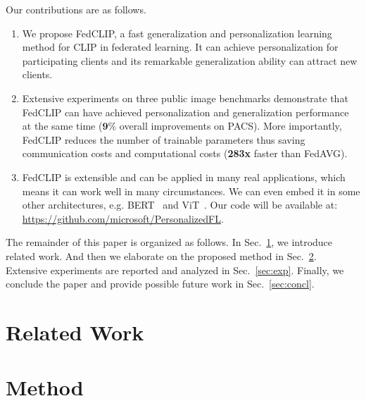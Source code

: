 \documentclass[11pt]{article}
\newcommand{\sectionname}{Sec.}
\newcommand{\method}{FedCLIP\xspace}
\newcommand{\wjdd}[1]{\todo[linecolor=cyan,backgroundcolor=cyan!25,bordercolor=cyan,size=\scriptsize]{(WJD): #1}}
\newcommand{\wjd}[1]{{\color{cyan}{[(WJD): #1]}}}
\begin{document}
Our contributions are as follows.
\begin{enumerate}
    \item We propose \method, a fast generalization and personalization learning method for CLIP in federated learning. It can achieve personalization for participating clients and its remarkable generalization ability can attract new clients.
    \item Extensive experiments on three public image benchmarks demonstrate that \method can have achieved personalization and generalization performance at the same time ($\textbf{9}\%$ overall improvements on PACS). More importantly, \method reduces the number of trainable parameters thus saving communication costs and computational costs (\textbf{283x} faster than FedAVG).%
    \item \method is extensible and can be applied in many real applications, which means it can work well in many circumstances. We can even embed it in some other architectures, e.g. BERT~\cite{Jindong-tenney2019bert} and ViT~\cite{Jindong-han2022survey}.
    Our code will be available at: \url{https://github.com/microsoft/PersonalizedFL}.
\end{enumerate}

The remainder of this paper is organized as follows.
In \sectionname~\ref{sec:relw}, we introduce related work.
And then we elaborate on the proposed method in \sectionname~\ref{sec:method}.
Extensive experiments are reported and analyzed in \sectionname~\ref{sec:exp}.
Finally, we conclude the paper and provide possible future work in \sectionname~\ref{sec:concl}.

\section{Related Work}
\label{sec:relw}


\section{Method}
\label{sec:method}
\end{document}
